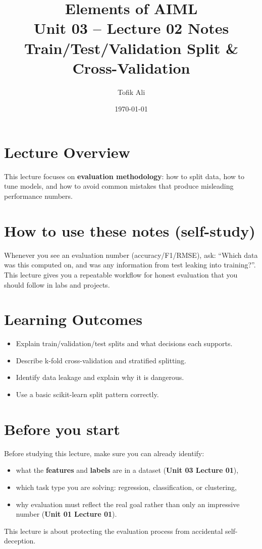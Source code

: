 \documentclass[11pt]{article}
\title{Elements of AIML\\Unit 03 -- Lecture 02 Notes\\Train/Test/Validation Split \& Cross-Validation}
\author{Tofik Ali}
\date{\today}
\begin{document}
\maketitle
\tableofcontents

\section{Lecture Overview}
This lecture focuses on \textbf{evaluation methodology}: how to split data, how to tune models, and how to avoid common mistakes that produce misleading performance numbers.
\notesources{\AIMLUnitIIISources}

\section{How to use these notes (self-study)}
Whenever you see an evaluation number (accuracy/F1/RMSE), ask: ``Which data was this computed on, and was any information from test leaking into training?''.
This lecture gives you a repeatable workflow for honest evaluation that you should follow in labs and projects.

\section{Learning Outcomes}
\begin{itemize}[leftmargin=*]
  \item Explain train/validation/test splits and what decisions each supports.
  \item Describe k-fold cross-validation and stratified splitting.
  \item Identify data leakage and explain why it is dangerous.
  \item Use a basic scikit-learn split pattern correctly.
\end{itemize}

\section{Before you start}
Before studying this lecture, make sure you can already identify:
\begin{itemize}[leftmargin=*]
  \item what the \textbf{features} and \textbf{labels} are in a dataset (\textbf{Unit 03 Lecture 01}),
  \item which task type you are solving: regression, classification, or clustering,
  \item why evaluation must reflect the real goal rather than only an impressive number (\textbf{Unit 01 Lecture 01}).
\end{itemize}
This lecture is about protecting the evaluation process from accidental self-deception.
\end{document}
